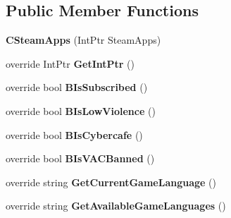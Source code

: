 \subsection*{Public Member Functions}
\begin{DoxyCompactItemize}
\item 
\hypertarget{classValve_1_1Steamworks_1_1CSteamApps_a3876822f1a102d2af96cf1c42e73ba3a}{}{\bfseries C\+Steam\+Apps} (Int\+Ptr Steam\+Apps)\label{classValve_1_1Steamworks_1_1CSteamApps_a3876822f1a102d2af96cf1c42e73ba3a}

\item 
\hypertarget{classValve_1_1Steamworks_1_1CSteamApps_adb6c99246d5edfb4185762c83afe0812}{}override Int\+Ptr {\bfseries Get\+Int\+Ptr} ()\label{classValve_1_1Steamworks_1_1CSteamApps_adb6c99246d5edfb4185762c83afe0812}

\item 
\hypertarget{classValve_1_1Steamworks_1_1CSteamApps_ae7d65b5cd9ac2910ff414da1b148a4af}{}override bool {\bfseries B\+Is\+Subscribed} ()\label{classValve_1_1Steamworks_1_1CSteamApps_ae7d65b5cd9ac2910ff414da1b148a4af}

\item 
\hypertarget{classValve_1_1Steamworks_1_1CSteamApps_a83b567ec8103bf93dcaba869f6dd0d28}{}override bool {\bfseries B\+Is\+Low\+Violence} ()\label{classValve_1_1Steamworks_1_1CSteamApps_a83b567ec8103bf93dcaba869f6dd0d28}

\item 
\hypertarget{classValve_1_1Steamworks_1_1CSteamApps_a1d28414c31ee31d96d8ffe8f72a9a359}{}override bool {\bfseries B\+Is\+Cybercafe} ()\label{classValve_1_1Steamworks_1_1CSteamApps_a1d28414c31ee31d96d8ffe8f72a9a359}

\item 
\hypertarget{classValve_1_1Steamworks_1_1CSteamApps_a35dc6e1a756d7ebfa2f62f50f123b02b}{}override bool {\bfseries B\+Is\+V\+A\+C\+Banned} ()\label{classValve_1_1Steamworks_1_1CSteamApps_a35dc6e1a756d7ebfa2f62f50f123b02b}

\item 
\hypertarget{classValve_1_1Steamworks_1_1CSteamApps_a503a56e9dd9fa47c3bce486c3674abb4}{}override string {\bfseries Get\+Current\+Game\+Language} ()\label{classValve_1_1Steamworks_1_1CSteamApps_a503a56e9dd9fa47c3bce486c3674abb4}

\item 
\hypertarget{classValve_1_1Steamworks_1_1CSteamApps_a4839ff0af6755a64068cf6e65665376e}{}override string {\bfseries Get\+Available\+Game\+Languages} ()\label{classValve_1_1Steamworks_1_1CSteamApps_a4839ff0af6755a64068cf6e65665376e}


\end{DoxyCompactItemize}
